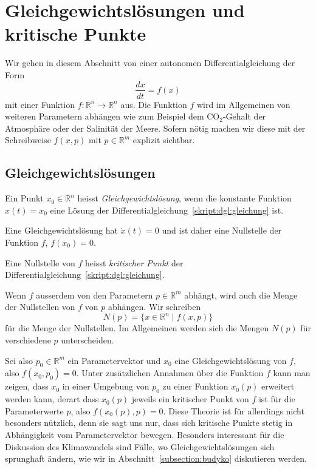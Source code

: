 %
%
%
\section{Gleichgewichtslösungen und kritische Punkte}
Wir gehen in diesem Abschnitt von einer autonomen Differentialgleichung
der Form
\begin{equation}
\frac{dx}{dt} = f(x)
\label{skript:dgl:gleichung}
\end{equation}
mit einer Funktion $f\colon \mathbb R^n \to \mathbb R^n$
aus.
Die Funktion $f$ wird im Allgemeinen von weiteren Parametern abhängen
wie zum Beispiel dem $\text{CO}_2$-Gehalt der Atmosphäre oder der Salinität
der Meere.
Sofern nötig machen wir diese mit der Schreibweise $f(x,p)$ mit
$p\in\mathbb R^m$ explizit sichtbar.

\subsection{Gleichgewichtslösungen}
\begin{definition}
Ein Punkt $x_0\in\mathbb R^n$ heisst {\em Gleichgewichtslösung},
wenn die konstante Funktion $x(t)=x_0$ eine Lösung der
Differentialgleichung~\ref{skript:dgl:gleichung} ist.
\end{definition}

Eine Gleichgewichtslösung hat $\dot{x}(t)=0$ und ist daher eine
Nullstelle der Funktion $f$,
$f(x_0)=0$.
\begin{definition}
Eine Nullstelle von $f$ heisst {\em kritischer Punkt} der
Differentialgleichung~\ref{skript:dgl:gleichung}.
\end{definition}
%

Wenn $f$ ausserdem von den Parametern $p\in\mathbb R^m$ abhängt,
wird auch die Menge der Nullstellen von $f$ von $p$ abhängen.
Wir schreiben
\[
N(p) = \{x\in\mathbb R^n\;|\; f(x,p)\}
\]
für die Menge der Nullstellen. 
Im Allgemeinen werden sich die Mengen $N(p)$ für verschiedene $p$ 
unterscheiden.

Sei also $p_0\in\mathbb R^m$ ein Parametervektor und $x_0$ eine
Gleichgewichtslösung von $f$, also $f(x_0,p_0)=0$.
Unter zusätzlichen Annahmen über die Funktion $f$ kann man zeigen,
dass $x_0$ in einer Umgebung von $p_0$ zu einer Funktion
$x_0(p)$ erweitert werden kann, derart dass $x_0(p)$ jeweils ein
kritischer Punkt von $f$ ist für die Parameterwerte $p$, also
$f(x_0(p),p)=0$.
Diese Theorie ist für allerdings nicht besonders nützlich, denn
sie sagt uns nur, dass sich kritische Punkte stetig in Abhängigkeit vom
Parametervektor bewegen.
Besonders interessant für die Diskussion des Klimawandels sind
Fälle, wo Gleichgewichtslösungen sich sprunghaft ändern, wie wir in
Abschnitt~\ref{subsection:budyko} diskutieren werden.

